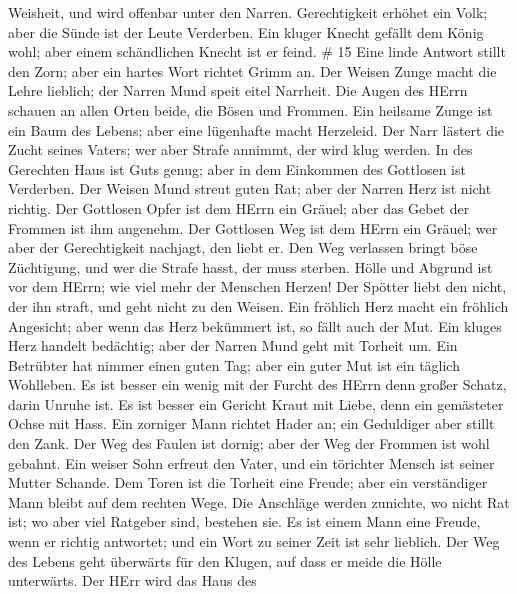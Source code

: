 Weisheit, und wird offenbar unter den Narren. 
Gerechtigkeit erhöhet ein Volk; aber die Sünde ist der Leute Verderben.
 Ein kluger Knecht gefällt dem König wohl; aber einem
schändlichen Knecht ist er feind. \# 15  Eine linde Antwort
stillt den Zorn; aber ein hartes Wort richtet Grimm an.  Der
Weisen Zunge macht die Lehre lieblich; der Narren Mund speit eitel
Narrheit.  Die Augen des HErrn schauen an allen Orten beide,
die Bösen und Frommen.  Ein heilsame Zunge ist ein Baum des
Lebens; aber eine lügenhafte macht Herzeleid.  Der Narr
lästert die Zucht seines Vaters; wer aber Strafe annimmt, der wird klug
werden.  In des Gerechten Haus ist Guts genug; aber in dem
Einkommen des Gottlosen ist Verderben.  Der Weisen Mund
streut guten Rat; aber der Narren Herz ist nicht richtig. 
Der Gottlosen Opfer ist dem HErrn ein Gräuel; aber das Gebet der Frommen
ist ihm angenehm.  Der Gottlosen Weg ist dem HErrn ein
Gräuel; wer aber der Gerechtigkeit nachjagt, den liebt er. 
Den Weg verlassen bringt böse Züchtigung, und wer die Strafe hasst, der
muss sterben.  Hölle und Abgrund ist vor dem HErrn; wie
viel mehr der Menschen Herzen!  Der Spötter liebt den
nicht, der ihn straft, und geht nicht zu den Weisen.  Ein
fröhlich Herz macht ein fröhlich Angesicht; aber wenn das Herz bekümmert
ist, so fällt auch der Mut.  Ein kluges Herz handelt
bedächtig; aber der Narren Mund geht mit Torheit um.  Ein
Betrübter hat nimmer einen guten Tag; aber ein guter Mut ist ein täglich
Wohlleben.  Es ist besser ein wenig mit der Furcht des
HErrn denn großer Schatz, darin Unruhe ist.  Es ist besser
ein Gericht Kraut mit Liebe, denn ein gemästeter Ochse mit Hass.
 Ein zorniger Mann richtet Hader an; ein Geduldiger aber
stillt den Zank.  Der Weg des Faulen ist dornig; aber der
Weg der Frommen ist wohl gebahnt.  Ein weiser Sohn erfreut
den Vater, und ein törichter Mensch ist seiner Mutter Schande.
 Dem Toren ist die Torheit eine Freude; aber ein
verständiger Mann bleibt auf dem rechten Wege.  Die
Anschläge werden zunichte, wo nicht Rat ist; wo aber viel Ratgeber sind,
bestehen sie.  Es ist einem Mann eine Freude, wenn er
richtig antwortet; und ein Wort zu seiner Zeit ist sehr lieblich.
 Der Weg des Lebens geht überwärts für den Klugen, auf dass
er meide die Hölle unterwärts.  Der HErr wird das Haus des
